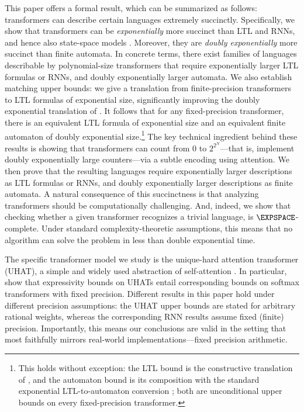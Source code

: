 \documentclass{article} %
\begin{document}
This paper offers a formal result, which can be summarized as follows: transformers can describe
certain languages extremely succinctly. 
Specifically, we show that transformers can be
\emph{exponentially} more succinct than LTL and RNNs, and hence also state-space models
\citep[SSMs;][]{mamba,ssm-will}.
Moreover, they are \emph{doubly exponentially} more
succinct than finite automata. In concrete terms, there exist families of
languages describable by polynomial-size transformers that require
exponentially larger LTL formulas or RNNs, and doubly exponentially larger
automata.
We also establish matching upper bounds: we give a translation from
finite-precision transformers to LTL formulas of exponential size,
significantly improving the doubly exponential translation of
\citet{YangCA24}. 
It follows that for any fixed-precision transformer,
there is an equivalent LTL formula of exponential size and an equivalent
finite automaton of doubly exponential size.\footnote{This holds without exception: the LTL bound is the constructive translation of , and the automaton bound is its composition with the standard exponential LTL-to-automaton conversion \citep{SistlaC85,VardiW94}; both are unconditional upper bounds on every fixed-precision transformer.}
The key technical ingredient
behind these results is showing that transformers can count from $0$ to
$2^{2^N}$---that is, implement doubly exponentially large counters---via a
subtle encoding using attention. We then prove that the resulting
languages require exponentially larger descriptions as LTL formulas or
RNNs, and doubly exponentially larger descriptions as finite automata.
A natural consequence of this succinctness is that analyzing transformers
should be computationally challenging.
And, indeed, we show that checking whether a given transformer
recognizes a trivial language, is $\EXPSPACE$-complete. Under standard
complexity-theoretic assumptions, this means that no algorithm can solve
the problem in less than double exponential time.

The specific transformer model we study is the
unique-hard attention transformer (UHAT), a simple and widely used
abstraction of self-attention
\citep{YangCA24,tale,transformers_survey,Hao22,LC25,hahn20,barcelo2024logical,uhat-data}.
In particular, \citet{tale} show that expressivity bounds on
UHATs entail corresponding bounds on softmax transformers with
fixed precision.
Different results in this paper hold under different precision assumptions: the UHAT upper bounds are stated for arbitrary rational weights, whereas the corresponding RNN results assume fixed (finite) precision.
Importantly, this means our conclusions are valid in the setting that most faithfully mirrors real-world implementations---fixed precision arithmetic.
\end{document}
